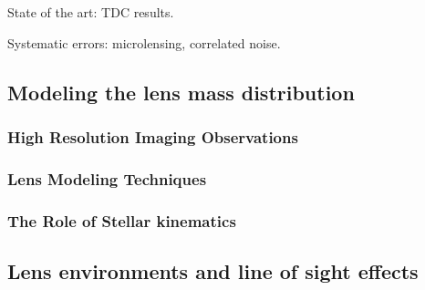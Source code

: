 State of the art: TDC results.

Systematic errors: microlensing, correlated noise.



\subsection{Modeling the lens mass distribution}
\label{sec:lensmodel}



\subsubsection{High Resolution Imaging Observations}





\subsubsection{Lens Modeling Techniques}




\subsubsection{The Role of Stellar kinematics}



\subsection{Lens environments and line of sight effects}
\label{sec:los}





